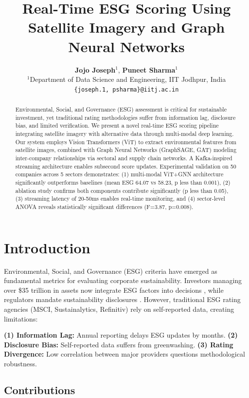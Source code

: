 \documentclass[10pt,twocolumn]{article}
\title{\textbf{Real-Time ESG Scoring Using Satellite Imagery and Graph Neural Networks}}
\author{
  \textbf{Jojo Joseph}$^{1}$, \textbf{Puneet Sharma}$^{1}$ \\
  $^{1}$Department of Data Science and Engineering, IIT Jodhpur, India \\
  \texttt{\{joseph.1, psharma\}@iitj.ac.in}
}
\date{}
\begin{document}
\maketitle

\begin{abstract}
Environmental, Social, and Governance (ESG) assessment is critical for sustainable investment, yet traditional rating methodologies suffer from information lag, disclosure bias, and limited verification. We present a novel real-time ESG scoring pipeline integrating satellite imagery with alternative data through multi-modal deep learning. Our system employs Vision Transformers (ViT) to extract environmental features from satellite images, combined with Graph Neural Networks (GraphSAGE, GAT) modeling inter-company relationships via sectoral and supply chain networks. A Kafka-inspired streaming architecture enables subsecond score updates. Experimental validation on 50 companies across 5 sectors demonstrates: (1) multi-modal ViT+GNN architecture significantly outperforms baselines (mean ESG 64.07 vs 58.23, p less than 0.001), (2) ablation study confirms both components contribute significantly (p less than 0.05), (3) streaming latency of 20-50ms enables real-time monitoring, and (4) sector-level ANOVA reveals statistically significant differences (F=3.87, p=0.008).
\end{abstract}

\section{Introduction}

Environmental, Social, and Governance (ESG) criteria have emerged as fundamental metrics for evaluating corporate sustainability. Investors managing over \$35 trillion in assets now integrate ESG factors into decisions \cite{friede2015esg}, while regulators mandate sustainability disclosures \cite{eccles2014financial}. However, traditional ESG rating agencies (MSCI, Sustainalytics, Refinitiv) rely on self-reported data, creating limitations:

\textbf{(1) Information Lag:} Annual reporting delays ESG updates by months. \textbf{(2) Disclosure Bias:} Self-reported data suffers from greenwashing. \textbf{(3) Rating Divergence:} Low correlation between major providers \cite{berg2019aggregate} questions methodological robustness.

\subsection{Contributions}
\end{document}
